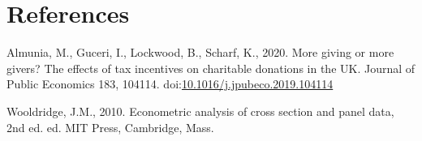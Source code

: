 \documentclass[
  11pt,
  a4paper,
]{article}
\newlength{\cslhangindent}
\newlength{\cslentryspacingunit} %
\newenvironment{CSLReferences}[2] %
 {%
  \setlength{\parindent}{0pt}
  \ifodd #1
  \let\oldpar\par
  \def\par{\hangindent=\cslhangindent\oldpar}
  \fi
  \setlength{\parskip}{#2\cslentryspacingunit}
 }%
 {}
\begin{document}
\hypertarget{references}{%
\section*{References}\label{references}}

\hypertarget{refs}{}
\begin{CSLReferences}{1}{0}
\leavevmode{}%
Almunia, M., Guceri, I., Lockwood, B., Scharf, K., 2020. More giving or more givers? {The} effects of tax incentives on charitable donations in the {UK}. Journal of Public Economics 183, 104114. doi:\href{https://doi.org/10.1016/j.jpubeco.2019.104114}{10.1016/j.jpubeco.2019.104114}

\leavevmode{}%
Wooldridge, J.M., 2010. Econometric analysis of cross section and panel data, 2nd ed. ed. {MIT Press}, {Cambridge, Mass}.

\end{CSLReferences}
\end{document}
